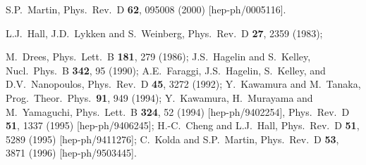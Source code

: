 \documentclass[12pt]{article}
\begin{document}
\begin{thebibliography}{999}
  S.P.~Martin,
  Phys.\ Rev.\  D {\bf 62}, 095008 (2000)
  [hep-ph/0005116].

  L.J.~Hall, J.D.~Lykken and S.~Weinberg, 
  Phys.\ Rev.\ D {\bf 27}, 2359 (1983);

M.~Drees, 
  Phys.\ Lett.\ B {\bf 181}, 279 (1986);
J.S.~Hagelin and S.~Kelley, 
  Nucl.\ Phys.\ B {\bf 342}, 95 (1990);
A.E.~Faraggi, J.S.~Hagelin, S.~Kelley, and D.V.~Nanopoulos,
  Phys.\ Rev.\ D {\bf 45}, 3272 (1992);
Y.~Kawamura and M.~Tanaka, 
  Prog.\ Theor.\ Phys.\  {\bf 91}, 949 (1994);
Y.~Kawamura, H.~Murayama and M.~Yamaguchi,
  Phys.\ Lett.\ B {\bf 324}, 52 (1994)
  [hep-ph/9402254],
  Phys.\ Rev.\ D {\bf 51}, 1337 (1995)
  [hep-ph/9406245];
H.-C.~Cheng and L.J.~Hall, 
  Phys.\ Rev.\ D {\bf 51}, 5289 (1995)
  [hep-ph/9411276];
C.~Kolda and S.P.~Martin, 
  Phys.\ Rev.\ D {\bf 53}, 3871 (1996)
  [hep-ph/9503445].


\end{thebibliography}
\end{document}
